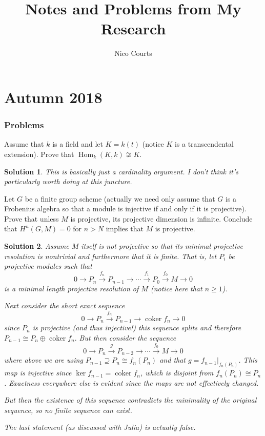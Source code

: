 \documentclass[12pt]{article}
\theoremstyle{nonumberbreak}
\newtheorem{sol}{Solution}
\theoremstyle{changebreak}
\theoremstyle{nonumberplain}
\theoremstyle{change}
\DeclareMathOperator{\Hom}{Hom}
\DeclareMathOperator{\coker}{coker}
\let\oldpart\part%
\renewcommand{\part}{\clearpage\oldpart}%
\begin{document}
\title{Notes and Problems from My Research\vspace{-1ex}}
\author{Nico Courts}
\date{}
\maketitle

\part{Autumn 2018}
\section{Problems}
\begin{prob}
	Assume that $k$ is a field and let $K=k(t)$ (notice $K$ is a transcendental extension). Prove that $\Hom_k(K,k)\not\cong K$.
\end{prob}

\begin{sol}
	This is basically just a cardinality argument. I don't think it's particularly worth doing at this juncture.
\end{sol}

\begin{prob}
	Let $G$ be a finite group scheme (actually we need only assume that $G$ is a Frobenius algebra so that a module
	is injective if and only if it is projective). Prove that unless $M$ is projective, its projective dimension is 
	infinite. Conclude that $H^n(G,M)=0$ for $n>N$ implies that $M$ is projective.
\end{prob}
\begin{sol}
	Assume $M$ itself is not projective so that its minimal projective resolution is nontrivial and furthermore
	that it is finite. That is, let $P_i$ be projective modules such that
	\[0\to P_n\xrightarrow{f_n} P_{n-1}\to\cdots \xrightarrow{f_{1}}P_0\xrightarrow{f_0} M\to 0\]
	is a minimal length projective resolution of $M$ (notice here that $n\ge 1$). 
	
	Next consider the short exact sequence
	\[0\to P_n\xrightarrow{f_n}P_{n-1}\to \coker f_n\to 0\]
	since $P_n$ is projective (and thus injective!) this sequence splits and therefore $P_{n-1}\cong P_n\oplus\coker f_n.$
	But then consider the sequence
	\[0\to P_n\xrightarrow{g} P_{n-2}\to\cdots\xrightarrow{f_0}M\to 0\]
	where above we are using $P_{n-1}\supseteq P_n\cong f_n(P_n)$  and that
	$g=f_{n-1}|_{f_n(P_n)}$. This map is injective since $\ker f_{n-1}=\coker f_n$, which is disjoint
	from $f_n(P_n)\cong P_n$. Exactness everywhere else is evident since the maps are not effectively changed.

	But then the existence of this sequence contradicts the minimality of the original sequence, so
	no finite sequence can exist.

	The last statement (as discussed with Julia) is actually false. 
\end{sol}
\end{document}

